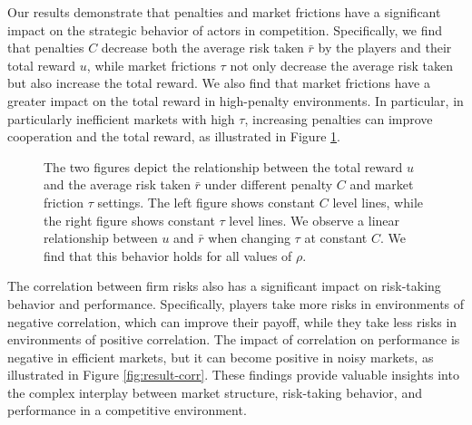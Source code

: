 \documentclass[preprint,12pt,authoryear]{elsarticle}
\theoremstyle{definition}
\begin{document}
Our results demonstrate that penalties and market frictions have a significant impact on the strategic behavior of actors in competition. Specifically, we find that penalties $C$ decrease both the average risk taken $\bar r$ by the players and their total reward $u$, while market frictions $\tau$ not only decrease the average risk taken but also increase the total reward. We also find that market frictions have a greater impact on the total reward in high-penalty environments. In particular, in particularly inefficient markets with high $\tau$, increasing penalties can improve cooperation and the total reward, as illustrated in Figure \ref{fig:result-noise}.

\begin{figure}[htbp]
  \centering
  \begin{minipage}[t]{0.48\textwidth}
    \centering
    
  \end{minipage}
  \hfill
  \begin{minipage}[t]{0.48\textwidth}
    \centering
    
  \end{minipage}
  \caption{
  The two figures depict the relationship between the total reward $u$ and the average risk taken $\bar r$ under different penalty $C$ and market friction $\tau$ settings. The left figure shows constant $C$ level lines, while the right figure shows constant $\tau$ level lines. We observe a linear relationship between $u$ and $\bar r$ when changing $\tau$ at constant $C$. We find that this behavior holds for all values of $\rho$.}
  \label{fig:result-noise}  
\end{figure}

 The correlation between firm risks also has a significant impact on risk-taking behavior and performance. Specifically, players take more risks in environments of negative correlation, which can improve their payoff, while they take less risks in environments of positive correlation. The impact of correlation on performance is negative in efficient markets, but it can become positive in noisy markets, as illustrated in Figure \ref{fig:result-corr}. These findings provide valuable insights into the complex interplay between market structure, risk-taking behavior, and performance in a competitive environment.
\end{document}
